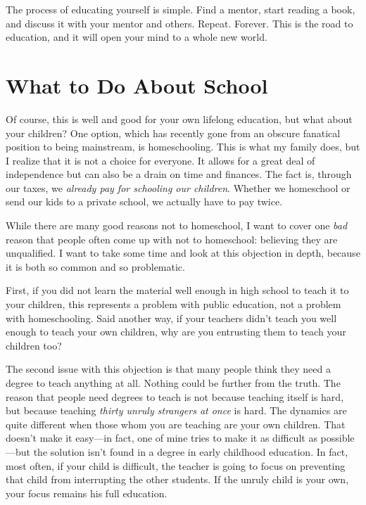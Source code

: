 \documentclass[letterpaper]{article}
\begin{document}
{\color{black}
The process of educating yourself is simple. Find a mentor, start
reading a book, and discuss it with
\textcolor[rgb]{0.32941177,0.5529412,0.83137256}{your mentor and
others}. Repeat. Forever. This is the road to education, and it will
open your mind to a whole new world. }

\section{What to Do About School}
{\color{black}
Of course, this is well and good for your own lifelong education, but
what about your children?  One option, which has recently gone from an
obscure fanatical position to being mainstream, is homeschooling. This
is what my family does, but I realize that it is not a choice for
everyone. It allows for a great deal of independence but can also be a
drain on time and finances. The fact is, through our taxes, we
\textit{already pay for schooling our children}.
\textcolor[rgb]{0.32941177,0.5529412,0.83137256}{Whether }we homeschool
or \textcolor[rgb]{0.32941177,0.5529412,0.83137256}{send our kids to a
}private school, we actually have to pay twice. }

{\color{black}
While there are many good reasons not to homeschool, I want to cover one
\textit{bad} reason that people often come up with not to homeschool:
\textcolor[rgb]{0.32941177,0.5529412,0.83137256}{believing they are
unqualified. } I want to take some time and look at this objection in
depth, because it is both so common and so problematic. }

{\color{black}
\textcolor[rgb]{0.32941177,0.5529412,0.83137256}{First, }if you did not
learn the material well enough in high school to teach it to your
children, this represents a problem with public education, not a
problem with homeschooling.
\textcolor[rgb]{0.32941177,0.5529412,0.83137256}{Said another way, if
your teachers didn’t teach you well enough to teach your own children,
}why are you entrusting them to teach your children too?  }

{\color{black}
The second issue with this objection is that many people think they need
a degree to teach anything at all. Nothing could be further from the
truth. The reason that people need degrees to teach is not because
teaching itself is hard, but because teaching \textit{thirty unruly
strangers at once} is hard. The dynamics are quite different when
\textcolor[rgb]{0.32941177,0.5529412,0.83137256}{those whom you are
teaching} are your own children. That doesn’t make it easy—in fact, one
of mine tries to make it as difficult as possible—but the solution
isn’t found in a degree in early childhood education. In fact, most
often, if your child is difficult, the teacher is going to focus on
preventing that child from interrupting the other students. If the
unruly child is your own, your focus remains his full education.}
\end{document}
